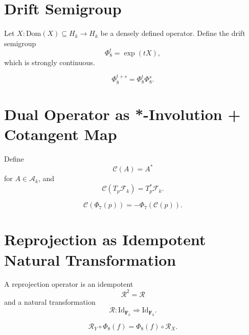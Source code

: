 \section{Drift Semigroup}

\begin{definition}
Let $X : \mathrm{Dom}(X) \subseteq H_k \to H_k$ be a densely defined operator.
Define the drift semigroup
\[
\Phi_8^t = \exp(tX),
\]
which is strongly continuous.
\end{definition}

\begin{lemma}
\[
\Phi_8^{t+s} = \Phi_8^t \Phi_8^s.
\]
\end{lemma}

\section{Dual Operator as *-Involution + Cotangent Map}

\begin{definition}
Define
\[
\mathcal{C}(A) = A^\ast
\]
for $A \in \mathcal{A}_k$, and
\[
\mathcal{C}(T_p\mathcal{F}_k) = T_p^\ast\mathcal{F}_k.
\]
\end{definition}

\begin{lemma}
\[
\mathcal{C}(\Phi_7(p)) = -\Phi_7(\mathcal{C}(p)).
\]
\end{lemma}

\section{Reprojection as Idempotent Natural Transformation}

\begin{definition}[Reprojection]
A reprojection operator is an idempotent
\[
\mathcal{R}^2 = \mathcal{R}
\]
and a natural transformation
\[
\mathcal{R} : \mathrm{Id}_{\mathbf{F}_k} \Rightarrow \mathrm{Id}_{\mathbf{F}_k}.
\]
\end{definition}

\begin{lemma}
\[
\mathcal{R}_Y \circ \Phi_8(f) = \Phi_8(f) \circ \mathcal{R}_X.
\]
\end{lemma}

